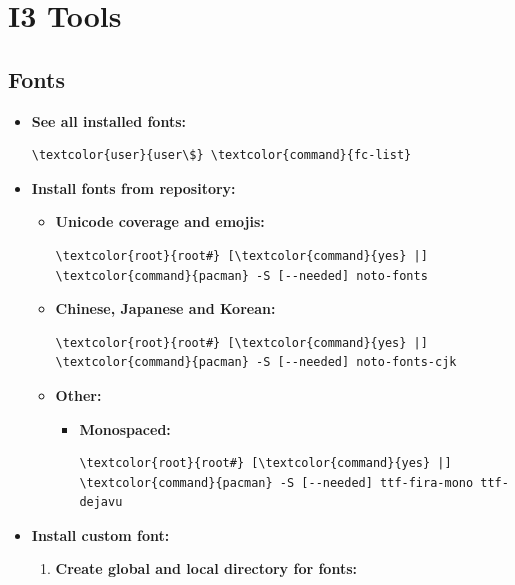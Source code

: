 \documentclass[10pt, a4paper, onecolumn, oneside, titlepage, openany]{book}
\begin{document}
\chapter{I3 Tools}
\section{Fonts}
\begin{itemize}
    \item \textbf{See all installed fonts:}
\begin{Verbatim}[commandchars=\\\{\}]
\textcolor{user}{user\$} \textcolor{command}{fc-list}
\end{Verbatim}
    \item \textbf{Install fonts from repository:}
    \begin{itemize}
        \item \textbf{Unicode coverage and emojis:}
\begin{Verbatim}[commandchars=\\\{\}]
\textcolor{root}{root#} [\textcolor{command}{yes} |] \textcolor{command}{pacman} -S [--needed] noto-fonts
\end{Verbatim}        
        \item \textbf{Chinese, Japanese and Korean:}
\begin{Verbatim}[commandchars=\\\{\}]
\textcolor{root}{root#} [\textcolor{command}{yes} |] \textcolor{command}{pacman} -S [--needed] noto-fonts-cjk
\end{Verbatim}
        \item \textbf{Other:}
        \begin{itemize}
            \item \textbf{Monospaced:}
\begin{Verbatim}[commandchars=\\\{\}]
\textcolor{root}{root#} [\textcolor{command}{yes} |] \textcolor{command}{pacman} -S [--needed] ttf-fira-mono ttf-dejavu
\end{Verbatim}
        \end{itemize}
    \end{itemize}
    \item \textbf{Install custom font:}
    \begin{enumerate}
        \item \textbf{Create global and local directory for fonts:}
\begin{Verbatim}[commandchars=\\\{\}]

\end{Verbatim}
\end{enumerate}
\end{itemize}
\end{document}
